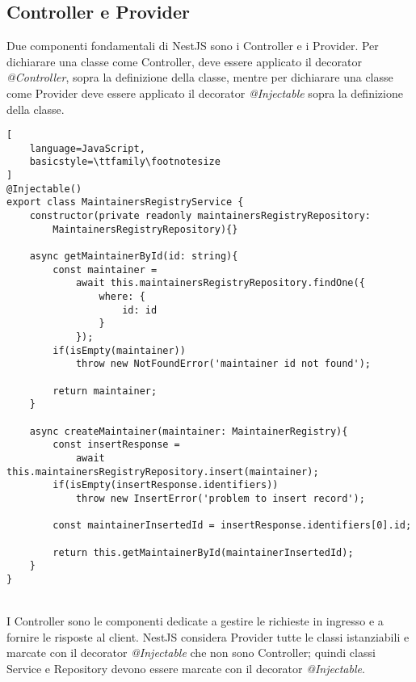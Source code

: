 \subsection{Controller e Provider}
Due componenti fondamentali di NestJS sono i Controller e i Provider. 
Per dichiarare una classe come Controller, deve essere applicato il decorator \textit{@Controller}, sopra la 
definizione della classe, mentre per dichiarare una classe come Provider deve essere applicato il decorator
\textit{@Injectable} sopra la definizione della classe.
\\
\begin{lstlisting}[
    language=JavaScript,
    basicstyle=\ttfamily\footnotesize
]
@Injectable()
export class MaintainersRegistryService {
    constructor(private readonly maintainersRegistryRepository: 
        MaintainersRegistryRepository){}

    async getMaintainerById(id: string){
        const maintainer = 
            await this.maintainersRegistryRepository.findOne({
                where: {
                    id: id
                }
            });
        if(isEmpty(maintainer))
            throw new NotFoundError('maintainer id not found');

        return maintainer;
    }

    async createMaintainer(maintainer: MaintainerRegistry){
        const insertResponse = 
            await this.maintainersRegistryRepository.insert(maintainer);
        if(isEmpty(insertResponse.identifiers))
            throw new InsertError('problem to insert record');

        const maintainerInsertedId = insertResponse.identifiers[0].id;

        return this.getMaintainerById(maintainerInsertedId);
    }
}
\end{lstlisting}
\leavevmode\newline
\\
I Controller sono le componenti dedicate a gestire le richieste in ingresso e a fornire le risposte al
client. NestJS considera Provider tutte le classi istanziabili e marcate con il decorator 
\textit{@Injectable} che non sono Controller; quindi classi Service e Repository devono essere marcate
con il decorator \textit{@Injectable}. 
\\
